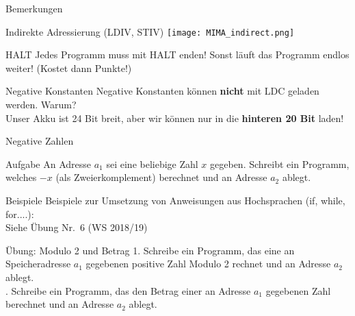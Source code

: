 \begin{frame}{Bemerkungen}
	\begin{block}{Indirekte Adressierung (LDIV, STIV)}
		\centering
		\texttt{[image: MIMA\_indirect.png]}
	\end{block}
	
	\pause
	\begin{block}{HALT}
		Jedes Programm muss mit HALT enden! Sonst läuft das Programm endlos weiter! (Kostet dann Punkte!)
	\end{block}

	\pause
	\begin{block}{Negative Konstanten}
		Negative Konstanten können \textbf{nicht} mit LDC geladen werden. Warum? \\
		\pause \impl Unser Akku ist 24 Bit breit, aber wir können nur in die \textbf{hinteren 20 Bit} laden!
	\end{block}
\end{frame}

\begin{frame}{Negative Zahlen}
	\begin{block}{Aufgabe}
		An Adresse $a_1$ sei eine beliebige Zahl $x$ gegeben. Schreibt ein Programm, welches $-x$ (als Zweierkomplement) berechnet und an Adresse $a_2$ ablegt.
	\end{block}

\end{frame}

\begin{frame}{Beispiele}
	Beispiele zur Umsetzung von Anweisungen aus Hochsprachen (if, while, for....):\\
	\bigskip
	Siehe Übung Nr.~6 (WS 2018/19)
\end{frame}

\begin{frame}{Übung: Modulo 2 und Betrag}
	1. Schreibe ein Programm, das eine an Speicheradresse $a_1$ gegebenen positive Zahl Modulo 2 rechnet und an Adresse $a_2$ ablegt. \\
	. Schreibe ein Programm, das den Betrag einer an Adresse $a_1$ gegebenen Zahl berechnet und an Adresse $a_2$ ablegt.
\end{frame}

